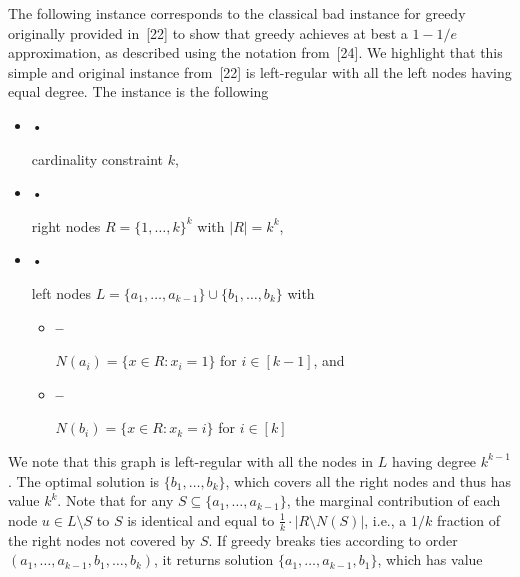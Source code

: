 \documentclass[10pt,a4paper]{article}
\begin{document}
The following instance corresponds to the classical bad instance for greedy originally provided in [22] to show that greedy achieves at best a $1-1/e$ approximation, as described using the notation from [24]. We highlight that this simple and original instance from [22] is left-regular with all the left nodes having equal degree. The instance is the following\par


\begin{itemize}


\item[] • 


cardinality constraint $k$,\par




\item[] • 


right nodes $R=\{1,\ldots,k\}^{k}$ with $|R|=k^{k}$,\par




\item[] • 


left nodes $L=\{a_{1},\ldots,a_{k-1}\}\cup\{b_{1},\ldots,b_{k}\}$ with\par


\begin{itemize}


\item[] \textbf{–} 


$N(a_{i})=\{x\in R:x_{i}=1\}$ for $i\in[k-1]$, and\par




\item[] \textbf{–} 


$N(b_{i})=\{x\in R:x_{k}=i\}$ for $i\in[k]$\par




\end{itemize}




\end{itemize}




We note that this graph is left-regular with all the nodes in $L$ having degree $k^{k-1}$. The optimal solution is $\{b_{1},\ldots,b_{k}\}$, which covers all the right nodes and thus has value $k^{k}$. Note that for any $S\subseteq\{a_{1},\ldots,a_{k-1}\}$, the marginal contribution of each node $u\in L\setminus S$ to $S$ is identical and equal to $\frac{1}{k}\cdot|R\setminus N(S)|$, i.e., a $1/k$ fraction of the right nodes not covered by $S$. If greedy breaks ties according to order $(a_{1},\ldots,a_{k-1},b_{1},\ldots,b_{k})$, it returns solution $\{a_{1},\ldots,a_{k-1},b_{1}\}$, which has value\par
\end{document}
